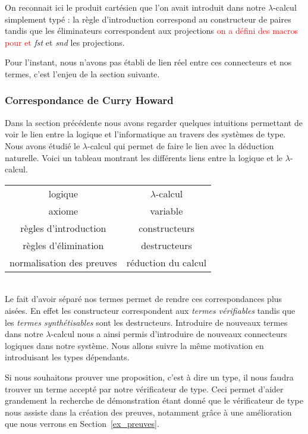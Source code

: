 \documentclass {article}
\theoremstyle{definition}
\theoremstyle{remark}
\newcommand{\todo}[1]{\textcolor{red}{#1}}
\begin{document}
On reconnait ici le produit cartésien que l'on avait introduit dans
notre $\lambda$-calcul simplement typé : la règle d'introduction
correspond au constructeur de paires tandis que les éliminateurs
correspondent aux projections \todo{on a défini des macros pour \Fst{} et \Snd{}} \emph{fst} et \emph{snd} les
projections.


Pour l'instant, nous n'avons pas établi de lien réel entre ces connecteurs et nos termes, c'est l'enjeu de la
section suivante.

\subsubsection{Correspondance de Curry Howard}
\label{corres_curry_howard}

Dans la section précédente nous avons regarder quelques intuitions permettant de voir le lien entre la logique
et l'informatique au travers des systèmes de type.
Nous avons étudié le $\lambda$-calcul qui permet de faire le lien avec la déduction naturelle. 
Voici un tableau montrant les différents liens entre la logique et le $\lambda$-calcul.

\begin{tabular}{c@{\quad$\leftrightarrow$\quad}c}
  logique & $\lambda$-calcul \\
  axiome & variable \\
  règles d'introduction & constructeurs \\
  règles d'élimination & destructeurs \\
  normalisation des preuves & réduction du calcul \\
\end{tabular}
\\


Le fait d'avoir séparé nos termes permet de rendre ces correspondances plus aisées. En effet les constructeur
correspondent aux \emph{termes vérifiables} tandis que les \emph{termes synthétisables} sont les destructeurs.
Introduire de nouveaux termes dans notre $\lambda$-calcul nous a ainsi permis d'introduire de nouveaux connecteurs logiques dans notre système. Nous allons suivre la même motivation en introduisant les types dépendants.

Si nous souhaitons prouver une proposition, c'est à dire un type, il nous faudra trouver
un terme accepté par notre vérificateur de type.
Ceci permet d'aider grandement la recherche de démonstration étant donné que le vérificateur de type nous assiste dans la création des preuves, notamment grâce à une amélioration
que nous verrons en Section~\ref{ex_preuves}.
\end{document}
